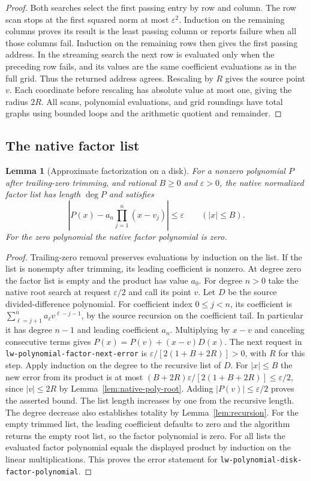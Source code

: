 \documentclass[11pt]{amsart}
\newtheorem{lemma}[theorem]{Lemma}
\theoremstyle{definition}
\theoremstyle{remark}
\numberwithin{equation}{section}
\newcommand{\code}[1]{\nolinkurl{#1}}
\begin{document}
\begin{proof}
Both searches select the first passing entry by row and
column. The row scan stops at the first squared norm at most
$\varepsilon^2$. Induction on the remaining columns proves
its result is the least passing column or reports failure
when all those columns fail. Induction on the remaining rows
then gives the first passing address. In the streaming search
the next row is evaluated only when the preceding row fails,
and its values are the same coefficient evaluations as in
the full grid. Thus the returned address agrees. Rescaling
by $R$ gives the source point $v$. Each coordinate before
rescaling has absolute value at most one, giving the radius
$2R$. All scans, polynomial evaluations, and grid roundings
have total graphs using bounded loops and the arithmetic
quotient and remainder.
\end{proof}

\subsection{The native factor list}

\begin{lemma}[Approximate factorization on a disk]\label{lem:native-factors}
For a nonzero polynomial $P$ after trailing-zero trimming,
and rational $B\ge0$ and $\varepsilon>0$, the native
normalized factor list has length $\deg P$ and satisfies
\[
     \left|P(x)-a_n\prod_{j=1}^n (x-v_j)\right|
           \le\varepsilon\qquad (|x|\le B).
\]
For the zero polynomial the native factor polynomial is zero.
\end{lemma}
\begin{proof}
Trailing-zero removal preserves evaluations by induction on
the list. If the list is nonempty after trimming, its leading
coefficient is nonzero. At degree zero the factor list is
empty and the product has value $a_0$.
For degree $n>0$ take the native root search at request
$\varepsilon/2$ and call its point $v$. Let $D$ be the source
divided-difference polynomial. For coefficient index
$0\le j<n$, its coefficient is
$\sum_{\ell=j+1}^n a_\ell v^{\ell-j-1}$, by the source
recursion on the coefficient tail. In particular it has
degree $n-1$ and leading coefficient $a_n$.
Multiplying by $x-v$ and canceling consecutive terms gives
$P(x)=P(v)+(x-v)D(x)$. The next request in
\code{lw-polynomial-factor-next-error} is
$\varepsilon/[2(1+B+2R)]>0$, with $R$ for this step.
Apply induction on the degree to the recursive list of $D$.
For $|x|\le B$ the new error from its product is at most
$(B+2R)\varepsilon/[2(1+B+2R)]\le\varepsilon/2$,
since $|v|\le2R$ by Lemma~\ref{lem:native-poly-root}.
Adding $|P(v)|\le\varepsilon/2$ proves the asserted bound.
The list length increases by one from the recursive length.
The degree decrease also establishes totality by
Lemma~\ref{lem:recursion}.
For the empty trimmed list, the leading coefficient defaults
to zero and the algorithm returns the empty root list,
so the factor polynomial is zero. For all lists the evaluated
factor polynomial equals the displayed product by induction
on the linear multiplications. This proves the error statement
for \code{lw-polynomial-disk-factor-polynomial}.
\end{proof}
\end{document}
